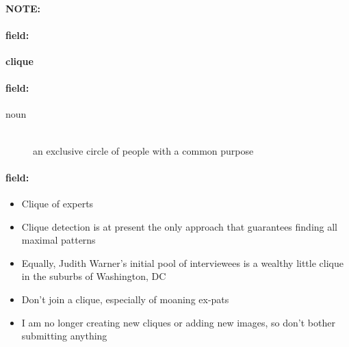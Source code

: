 \documentclass[12pt]{article}
\newenvironment{note}{\paragraph{NOTE:}}{}
\newenvironment{field}{\paragraph{field:}}{}
\begin{document}
\begin{note}
\begin{field}
\textbf{\large clique}
\end{field}


\begin{field}
\begin{description}
\item[noun] \hfill \\ 
an exclusive circle of people with a common purpose

\end{description}
\end{field}

\begin{field}
\begin{itemize}
\item Clique of experts
\item Clique detection is at present the only approach that guarantees finding all maximal patterns
\item Equally, Judith Warner's initial pool of interviewees is a wealthy little clique in the suburbs of Washington, DC
\item Don't join a clique, especially of moaning ex-pats
\item I am no longer creating new cliques or adding new images, so don't bother submitting anything
\end{itemize}
\end{field}
\end{note}
\end{document}
